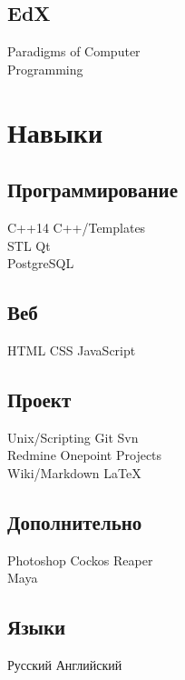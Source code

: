 \documentclass[a4paper]{curricula-vitae}
\begin{document}
\begin{minipage}[t]{0.33\textwidth}
\insertspace

\subsection{EdX}
Paradigms of Computer \\
Programming

\insertspace

\section{Навыки}

\subsection{Программирование}
C++14 \textbullet{} C++/Templates \\
STL \textbullet{} Qt \\
PostgreSQL

\insertspace

\subsection{Веб}
HTML \textbullet{} CSS \textbullet{} JavaScript

\insertspace

\subsection{Проект}
Unix/Scripting \textbullet{} Git \textbullet{} Svn \\
Redmine \textbullet{} Onepoint Projects \\
Wiki/Markdown \textbullet{} \LaTeX

\insertspace

\subsection{Дополнительно}
Photoshop \textbullet{} Cockos Reaper \\
Maya

\insertspace

\subsection{Языки}
Русский \textbullet{} Английский

\insertspace

\end{minipage} %
\end{document}
